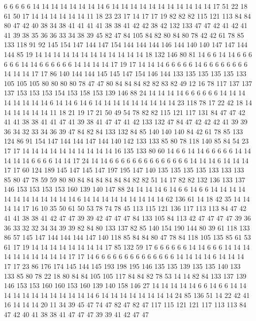 6 6 6 6 6 14 14 14 14 14 14 14 14 6 14 14 14 14 14 14
14 14 14 14 14 17 51 22 18 61 50 17 14 14 14 14 14 14 11 18
23 23 17 14 17 17 19 82 82 82 115 121 113 84 84 80 47 42 40 38
34 38 41 41 41 41 38 38 41 42 42 38 42 132 133 47 47 42 41 42
41 41 39 38 35 36 36 33 34 38 39 45 82 47 84 105 84 82 80 84
80 78 42 42 61 78 85 133 118 91 92 145 154 147 144 147 154 144 144 144
146 144 140 140 147 147 144 144 85 19 14 14 14 14 14 14 14 14 14 14
14 14 18 132 146 80 81 14 6 6 14 14 6 6 6 6 6 6 14 14
6 6 6 6 6 6 14 14 14 14 17 19 17 14 14 14 6 6 6 6
6 14 6 6 6 6 6 6 6 6 14 14 14 17 17 86 140 144 144 145
145 147 154 146 144 133 135 135 135 135 133 105 105 105 80 80 80 80 78 47
47 80 84 84 84 82 82 83 82 49 12 16 78 117 137 137 137 153 153 153
154 153 158 153 139 146 88 24 14 14 14 14 6 6 6 6 6 6 14 14
14 14 14 14 14 14 6 14 14 6 14 6 14 14 14 14 14 14 14 14
14 23 118 78 17 22 42 18 14 14 14 14 14 14 11 18 21 19 17 21
50 49 54 78 82 82 115 121 117 131 84 47 47 42 41 41 38 38 41 41
47 41 39 38 41 47 47 41 42 133 132 47 84 47 42 42 42 41 39 39
36 34 32 33 34 36 39 47 84 82 84 133 132 84 85 140 140 140 84 42
61 78 85 133 124 86 91 154 147 144 144 147 144 140 142 133 133 85 80 78
118 140 85 84 54 23 17 17 14 14 14 14 14 14 14 14 14 14 16 135
133 80 60 14 6 6 14 14 6 6 6 6 6 14 14 14 14 14 6 6
6 6 14 14 17 24 14 14 6 6 6 6 6 6 6 6 6 6 6 6
6 6 14 14 14 6 14 14 14 17 17 60 124 189 145 147 145 147 197 195
147 140 135 135 135 135 133 133 133 85 80 47 78 59 59 80 80 84 84 84
84 84 84 82 82 51 14 17 82 82 132 136 133 137 146 153 153 153 153 160
139 140 147 88 24 14 14 14 6 14 6 6 14 6 6 14 14 14 14 14
14 14 14 14 14 14 14 6 14 14 14 14 14 14 14 14 14 62 136 61
14 18 42 35 14 14 14 14 17 16 10 35 50 61 50 53 78 74 78 45
113 115 121 136 117 113 113 84 47 42 41 41 38 38 41 42 47 47 39 39
42 47 47 47 84 133 105 84 113 42 47 47 47 47 39 36 36 33 32 32
34 34 39 39 82 84 80 133 137 82 85 140 154 190 144 80 39 61 118 133
86 57 145 147 144 144 144 147 140 118 85 84 84 80 47 78 84 118 105 135
85 61 53 61 17 19 14 14 14 14 14 14 14 14 17 85 132 59 17 6
6 6 6 6 6 14 14 6 6 6 14 14 14 14 14 14 14 14 14 14
17 17 14 6 6 6 6 6 6 6 6 6 6 6 6 6 6 14 14 14
14 6 14 14 14 17 17 23 86 176 174 145 144 145 193 198 195 146 135 135
139 135 135 140 133 133 85 80 78 22 18 80 84 84 105 105 117 84 84 82
78 53 14 14 82 84 133 137 139 146 153 153 160 160 153 160 139 140 158 146
27 14 14 14 14 14 6 6 14 6 6 14 14 14 14 14 14 14 14 14
14 14 14 6 14 14 14 14 14 14 14 14 24 85 136 51 14 22 42 41
16 14 14 14 20 11 34 39 45 47 74 47 82 47 82 47 117 115 121 121
117 113 113 84 47 42 40 41 38 38 41 47 47 47 39 39 41 42 47 47
